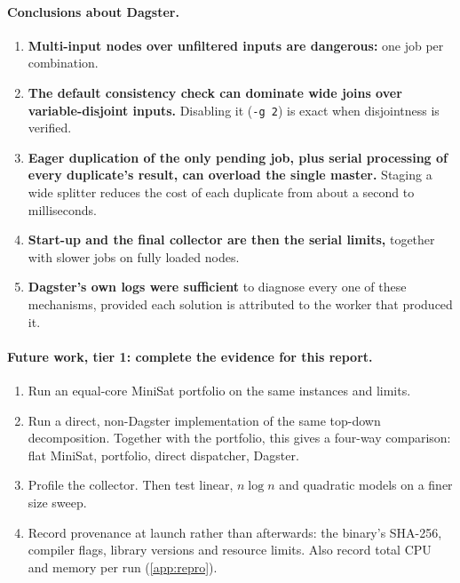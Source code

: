 \documentclass[11pt,a4paper]{article}
\newcommand{\opt}[1]{\texttt{#1}}
\begin{document}
\paragraph{Conclusions about Dagster.}
\begin{enumerate}
\item \textbf{Multi-input nodes over unfiltered inputs are dangerous:} one job per
      combination.
\item \textbf{The default consistency check can dominate wide joins over variable-disjoint
      inputs.} Disabling it (\opt{-g 2}) is exact when disjointness is verified.
\item \textbf{Eager duplication of the only pending job, plus serial processing of every
      duplicate's result, can overload the single master.} Staging a wide splitter reduces
      the cost of each duplicate from about a second to milliseconds.
\item \textbf{Start-up and the final collector are then the serial limits,} together with
      slower jobs on fully loaded nodes.
\item \textbf{Dagster's own logs were sufficient} to diagnose every one of these mechanisms,
      provided each solution is attributed to the worker that produced it.
\end{enumerate}

\paragraph{Future work, tier 1: complete the evidence for this report.}
\begin{enumerate}
\item Run an equal-core MiniSat portfolio on the same instances and limits.
\item Run a direct, non-Dagster implementation of the same top-down decomposition. Together
      with the portfolio, this gives a four-way comparison: flat MiniSat, portfolio, direct
      dispatcher, Dagster.
\item Profile the collector. Then test linear, $n\log n$ and quadratic models on a finer
      size sweep.
\item Record provenance at launch rather than afterwards: the binary's SHA-256,
      compiler flags, library versions and resource limits. Also record total CPU and
      memory per run (\cref{app:repro}).
\end{enumerate}
\end{document}
